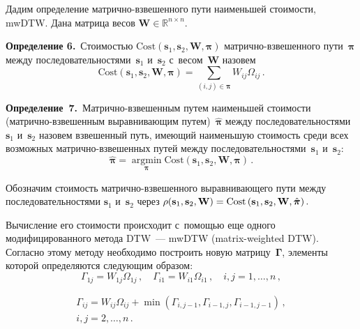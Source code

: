 \begin{multicols}{2}
Дадим определение мат\-рич\-но-взве\-шен\-но\-го пути наименьшей стоимости, mwDTW. 
Дана матрица весов $\mathbf{W} \in \mathbb{R}^{n\times n}$.

\smallskip

\noindent
\textbf{Определение 6.}\ 
Стоимостью $\mathrm{Cost}(\mathbf{s}_1,\mathbf{s}_2,\mathbf{W},{\boldsymbol{\pi}})$ 
мат\-рич\-но-взве\-шен\-но\-го пути~$\boldsymbol{\pi}$ между 
последовательностями~$\mathbf{s}_1$ и~$\mathbf{s}_2$ с~весом~$\mathbf{W}$ назовем
\begin{equation*}
\mathrm{Cost}\left(\mathbf{s}_1,\textbf{s}_2,\textbf{W},{\boldsymbol{\pi}}\right) = 
\sum\limits_{(i,j) \in \boldsymbol{\pi}}W_{ij}{\Omega}_{ij}\,.
\end{equation*}

\smallskip

\noindent
\textbf{Определение~7.}\
Мат\-рич\-но-взве\-шен\-ным путем наименьшей стоимости 
(мат\-рич\-но-взве\-шен\-ным выравнивающим путем)~$\hat{\boldsymbol{\pi}}$ между 
последовательностями~$\mathbf{s}_1$ и~$\mathbf{s}_2$ назовем взвешенный путь, 
имеющий наименьшую стоимость среди всех возможных мат\-рич\-но-взве\-шен\-ных 
путей между последовательностями~$\mathbf{s}_1$ и~$\mathbf{s}_2$:
\begin{equation}
\hat{\boldsymbol{\pi}} = \mathop{\mathrm{argmin}}\limits_{{\boldsymbol{\pi}}} 
\mathrm{Cost}\left(\mathbf{s}_1,\mathbf{s}_2,\mathbf{W},\boldsymbol{\pi}\right)\,.
\label{e6-g}
\end{equation}


Обозначим стоимость мат\-рич\-но-взве\-шен\-но\-го выравнивающего пути 
между последовательностями $\mathbf{s}_1$ и~$\mathbf{s}_2$ через 
$\rho(\mathbf{s}_1,\mathbf{s}_2,\mathbf{W})\hm = 
\mathrm{Cost}\left(\mathbf{s}_1,\mathbf{s}_2,\mathbf{W},\hat{\boldsymbol{\pi}}\right).$

 Вычисление его стоимости происходит с~помощью еще одного модифицированного 
 метода DTW~--- mwDTW (matrix-weighted DTW). Согласно этому методу необходимо 
 построить новую матрицу~$\boldsymbol{\Gamma}$, элементы которой определяются 
 следующим образом:
\begin{equation*}
\Gamma_{1j} = W_{1j}\Omega_{1j}\,,\quad 
\Gamma_{i1} = W_{i1}\Omega_{i1}\,,\quad 
i,j = 1, \dots , n\,,
\end{equation*}

\vspace*{-12pt}

\noindent
\begin{multline*}
\Gamma_{ij} = W_{ij}\Omega_{ij}+\min\left(
\Gamma_{i,j-1},\Gamma_{i-1,j},\Gamma_{i-1,j-1}\right)\,,\\ 
i,j = 2 , \dots , n\,.
\end{multline*}


\end{multicols}

